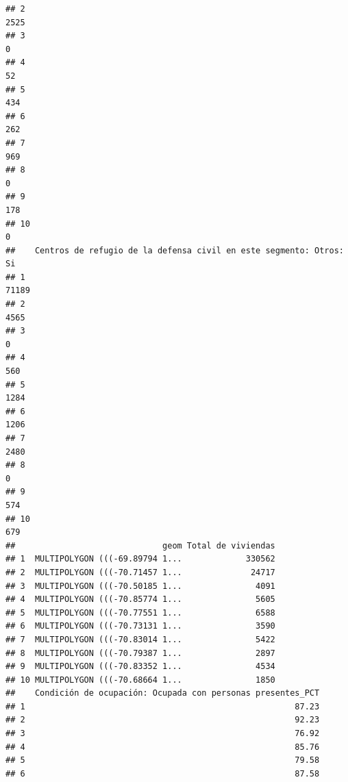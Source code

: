 \documentclass[11pt,]{article}
\begin{document}
\begin{verbatim}
## 2                                                                           2525
## 3                                                                              0
## 4                                                                             52
## 5                                                                            434
## 6                                                                            262
## 7                                                                            969
## 8                                                                              0
## 9                                                                            178
## 10                                                                             0
##    Centros de refugio de la defensa civil en este segmento: Otros: Si
## 1                                                               71189
## 2                                                                4565
## 3                                                                   0
## 4                                                                 560
## 5                                                                1284
## 6                                                                1206
## 7                                                                2480
## 8                                                                   0
## 9                                                                 574
## 10                                                                679
##                              geom Total de viviendas
## 1  MULTIPOLYGON (((-69.89794 1...             330562
## 2  MULTIPOLYGON (((-70.71457 1...              24717
## 3  MULTIPOLYGON (((-70.50185 1...               4091
## 4  MULTIPOLYGON (((-70.85774 1...               5605
## 5  MULTIPOLYGON (((-70.77551 1...               6588
## 6  MULTIPOLYGON (((-70.73131 1...               3590
## 7  MULTIPOLYGON (((-70.83014 1...               5422
## 8  MULTIPOLYGON (((-70.79387 1...               2897
## 9  MULTIPOLYGON (((-70.83352 1...               4534
## 10 MULTIPOLYGON (((-70.68664 1...               1850
##    Condición de ocupación: Ocupada con personas presentes_PCT
## 1                                                       87.23
## 2                                                       92.23
## 3                                                       76.92
## 4                                                       85.76
## 5                                                       79.58
## 6                                                       87.58

\end{verbatim}
\end{document}
